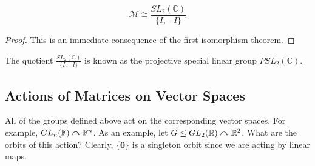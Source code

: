 \documentclass{article}
\begin{document}
	\begin{corollary}
		\[ \mathcal M \cong \frac{SL_2(\mathbb C)}{\{ I, -I \}} \]
	\end{corollary}
	\begin{proof}
		This is an immediate consequence of the first isomorphism theorem.
	\end{proof}
	The quotient $\frac{SL_2(\mathbb C)}{\{ I, -I \}}$ is known as the projective special linear group $PSL_2(\mathbb C)$.

	\subsection{Actions of Matrices on Vector Spaces}
	All of the groups defined above act on the corresponding vector spaces. For example, $GL_n(\mathbb F) \curvearrowright \mathbb F^n$. As an example, let $G \leq GL_2(\mathbb R) \curvearrowright \mathbb R^2$. What are the orbits of this action? Clearly, $\{ \bm 0 \}$ is a singleton orbit since we are acting by linear maps.
\end{document}
